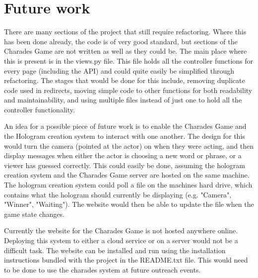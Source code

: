 \section{Future work}
There are many sections of the project that still require refactoring. Where this has been done already, the code is of very good standard, but sections of the Charades Game are not written as well as they could be. The main place where this is present is in the views.py file. This file holds all the controller functions for every page (including the API) and could quite easily be simplified through refactoring. The stages that would be done for this include, removing duplicate code used in redirects, moving simple code to other functions for both readability and maintainability, and using multiple files instead of just one to hold all the controller functionality.

An idea for a possible piece of future work is to enable the Charades Game and the Hologram creation system to interact with one another. The design for this would turn the camera (pointed at the actor) on when they were acting, and then display messages when either the actor is choosing a new word or phrase, or a viewer has guessed correctly. This could easily be done, assuming the hologram creation system and the Charades Game server are hosted on the same machine. The hologram creation system could poll a file on the machines hard drive, which contains what the hologram should currently be displaying (e.g. "Camera", "Winner", "Waiting"). The website would then be able to update the file when the game state changes.

Currently the website for the Charades Game is not hosted anywhere online. Deploying this system to either a cloud service or on a server would not be a difficult task. The website can be installed and run using the installation instructions bundled with the project in the README.txt file. This would need to be done to use the charades system at future outreach events.

